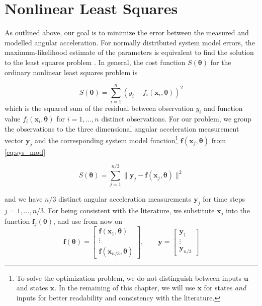 \section{Nonlinear Least Squares}
As outlined above, our goal is to minimize the error between the measured and modelled angular acceleration.
For normally distributed system model errors, the maximum-likelihood estimate of the parameters is equivalent to find the solution to the least squares problem \citep{Seber}.
In general, the cost function $S(\boldsymbol{\theta})$ for the ordinary nonlinear least squares problem is

\begin{equation}
S(\boldsymbol{\theta}) = \sum_{i=1}^n ( y_i - f_i(\mathbf{x}_i, \boldsymbol{\theta}) )^2
\end{equation}
which is the squared sum of the residual between observation
$y_i$
and function value
$f_i(\mathbf{x}_i, \boldsymbol{\theta})$
for
$i=1,...,n$ distinct observations.
For our problem, we group the observations to the three dimensional angular acceleration measurement vector $\mathbf{y}_j$ and the corresponding system model function\footnote{
To solve the optimization problem, we do not distinguish between inputs $\mathbf{u}$ and states $\mathbf{x}$.
In the remaining of this chapter, we will use $\mathbf{x}$ for states \textit{and} inputs for better readability and consistency with the literature.}
$\mathbf{f}(\mathbf{x}_j, \boldsymbol{\theta})$ from \cref{eq:sys_mod}

\begin{equation}
\label{eq:cost_f_x_theta}
S(\boldsymbol{\theta}) = \sum_{j=1}^{n/3} \| \mathbf{y}_j - \mathbf{f}(\mathbf{x}_j, \boldsymbol{\theta}) \|^2
\end{equation}

and we have $n/3$ distinct angular acceleration measurements $\mathbf{y}_j$ for time steps $j=1,...,n/3$.
For being consistent with the literature, we substitute $\mathbf{x}_j$ into the function $\mathbf{f}_j(\boldsymbol{\theta})$, and use from now on
\begin{equation}
\mathbf{f}(\boldsymbol{\theta}) = \left[ \begin{array}{c}
\mathbf{f}(\mathbf{x}_1, \boldsymbol{\theta}) \\
\vdots \\
\mathbf{f}(\mathbf{x}_{n/3}, \boldsymbol{\theta})
\end{array} \right]
, \qquad
\mathbf{y} = \left[ \begin{array}{c}
\mathbf{y}_1 \\
\vdots \\
\mathbf{y}_{n/3} 
\end{array} \right]
\end{equation}

